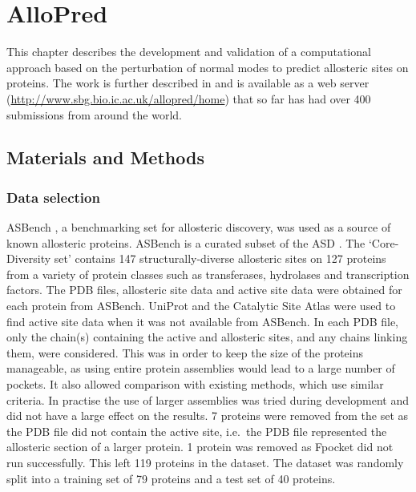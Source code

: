 \chapter{AlloPred}
\label{cha:allopred}

This chapter describes the development and validation of a computational approach based on the perturbation of normal modes to predict allosteric sites on proteins.
The work is further described in \cite{Greener2015} and is available as a web server (\url{http://www.sbg.bio.ic.ac.uk/allopred/home}) that so far has had over 400 submissions from around the world.


\section{Materials and Methods}
\label{sec:allopred_methods}

\subsection{Data selection}

ASBench \cite{Huang2015}, a benchmarking set for allosteric discovery, was used as a source of known allosteric proteins.
ASBench is a curated subset of the ASD \cite{Shen2016}.
The `Core-Diversity set' contains 147 structurally-diverse allosteric sites on 127 proteins from a variety of protein classes such as transferases, hydrolases and transcription factors.
The PDB files, allosteric site data and active site data were obtained for each protein from ASBench.
UniProt \cite{TheUniProtConsortium2015} and the Catalytic Site Atlas \cite{Furnham2014} were used to find active site data when it was not available from ASBench.
In each PDB file, only the chain(s) containing the active and allosteric sites, and any chains linking them, were considered.
This was in order to keep the size of the proteins manageable, as using entire protein assemblies would lead to a large number of pockets.
It also allowed comparison with existing methods, which use similar criteria.
In practise the use of larger assemblies was tried during development and did not have a large effect on the results.
7 proteins were removed from the set as the PDB file did not contain the active site, i.e.\ the PDB file represented the allosteric section of a larger protein.
1 protein was removed as Fpocket did not run successfully.
This left 119 proteins in the dataset.
The dataset was randomly split into a training set of 79 proteins and a test set of 40 proteins.


